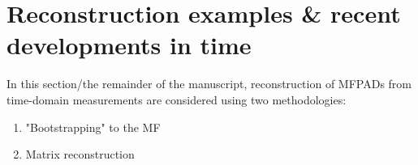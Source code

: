 \section{Reconstruction examples & recent developments in time}

In this section/the remainder of the manuscript, reconstruction of MFPADs from time-domain measurements are considered using two methodologies:

\begin{enumerate}
\item "Bootstrapping" to the MF
\item Matrix reconstruction
\end{enumerate}